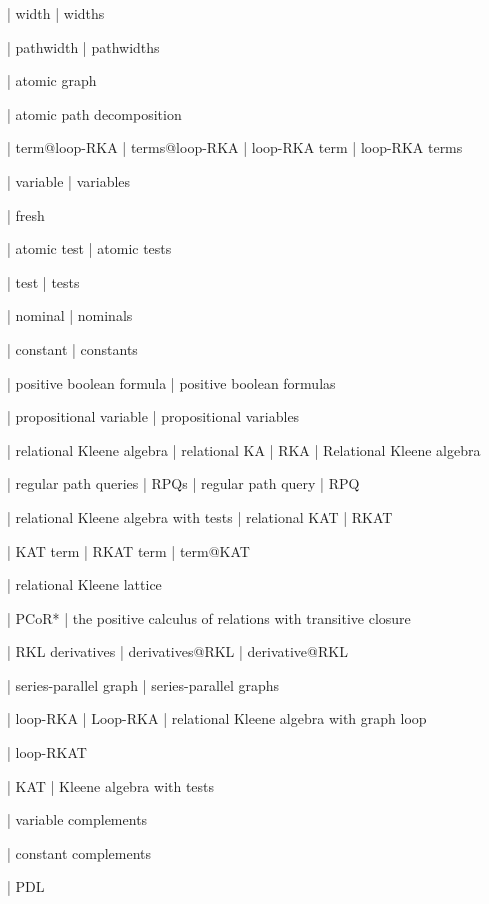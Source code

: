 | width
| widths

| pathwidth 
| pathwidths

| atomic graph

| atomic path decomposition

%
| term@loop-RKA
| terms@loop-RKA
| loop-RKA term
| loop-RKA terms

| variable
| variables

| fresh

| atomic test
| atomic tests

| test
| tests

| nominal
| nominals

| constant
| constants

| positive boolean formula
| positive boolean formulas

| propositional variable
| propositional variables

%
%
%

| relational Kleene algebra
| relational KA
| RKA
| Relational Kleene algebra

| regular path queries
| RPQs
| regular path query
| RPQ

| relational Kleene algebra with tests
| relational KAT
| RKAT

| KAT term
| RKAT term
| term@KAT

| relational Kleene lattice

| PCoR*
| the positive calculus of relations with transitive closure

| RKL derivatives
| derivatives@RKL
| derivative@RKL

| series-parallel graph
| series-parallel graphs

| loop-RKA
| Loop-RKA
| relational Kleene algebra with graph loop

| loop-RKAT

| KAT
| Kleene algebra with tests

| variable complements

| constant complements

| PDL

